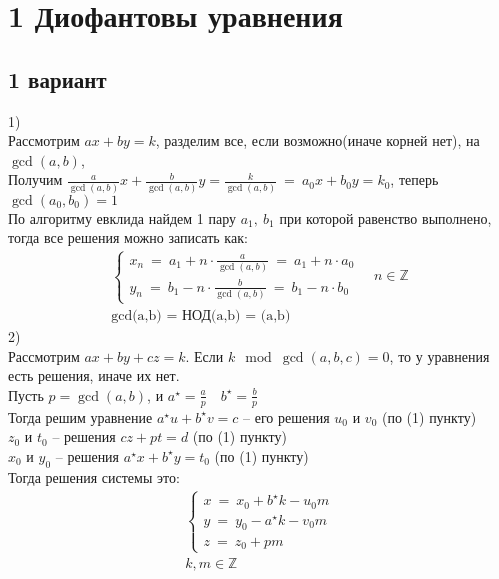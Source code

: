 \section{1 Диофантовы уравнения}
	\subsection{1 вариант}
		1)\\
		Рассмотрим $ax+by = k$, разделим все, если возможно(иначе корней нет), на $\gcd(a,b)$,\\
		Получим $\frac{a}{\gcd(a,b)} x+ \frac{b}{\gcd(a,b)} y = \frac{k}{\gcd(a,b)} \ = \ a_0 x + b_0 y = k_0$, теперь $\gcd(a_0,b_0) = 1$\\ 
		По алгоритму евклида найдем 1 пару $a_1,\ b_1$ при которой равенство выполнено, тогда все решения можно записать как:\\
		\begin{gather*}
			\begin{cases}
				x_n \ = \ a_1 + n \cdot \frac{a}{\gcd(a,b)} \ = \ a_1 + n \cdot a_0\\
				y_n \ = \ b_1 - n \cdot \frac{b}{\gcd(a,b)} \ = \ b_1 - n \cdot b_0
			\end{cases}
			\quad n \in \mathbb{Z}\\
			\text{gcd(a,b) \ = \ НОД(a,b) \ = \ (a,b)}
		\end{gather*}
		2)\\
		Рассмотрим $ax+by+cz = k$. Если $k \mod \gcd(a, b, c) = 0$, то у уравнения есть решения, иначе их нет.\\
		Пусть $p = \gcd(a, b)$, и $a^{\star} = \frac{a}{p} \quad b^{\star} = \frac{b}{p}$\\
		Тогда решим уравнение $a^{\star} u + b^{\star} v = c$ -- его решения $u_0$ и $v_0$ (по (1) пункту)\\
		$z_0$ и $t_0$ -- решения $cz + pt = d$ (по (1) пункту)\\
		$x_0$ и $y_0$ -- решения $a^{\star} x + b^{\star} y = t_0$ (по (1) пункту)\\
		Тогда решения системы это:
		\begin{gather*}
			\begin{cases}
				x \ = \ x_0 + b^{\star} k - u_0 m \\
				y \ = \ y_0 - a^{\star} k - v_0 m \\
				z \ = \ z_0 + p m
			\end{cases}
			\\
			k, m \in \mathbb{Z}
		\end{gather*}

